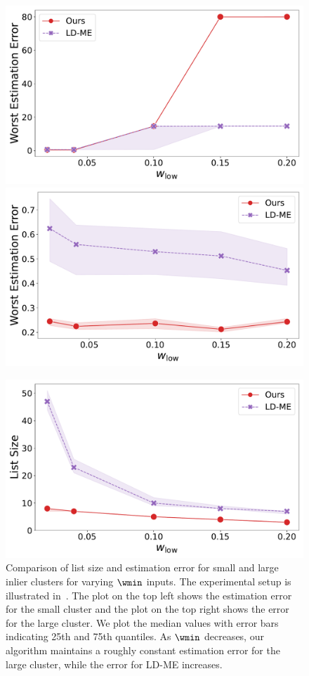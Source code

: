 \begin{figure}[hb]
    \centering
    \begin{minipage}[t]{\linewidth}
        \includegraphics[width=0.4\linewidth]
        {chapters/robust/figures/wlow_variation_error_small.pdf}
        \includegraphics[width=0.4\linewidth]{chapters/robust/figures/wlow_variation_error_large.pdf}
    \end{minipage}
    \begin{minipage}[t]{\linewidth}
        \centering
        \includegraphics[width=0.4\linewidth]{chapters/robust/figures/wlow_variation_size.pdf}
    \end{minipage}
    \caption{Comparison of list size and estimation error for small and large inlier clusters for varying \(\wmin\) inputs. The experimental setup is illustrated in~. The plot on the top left shows the estimation error for the small cluster and the plot on the top right shows the error for the large cluster. We plot the median values with error bars indicating 25th and 75th quantiles. As \(\wmin\) decreases, our algorithm maintains a roughly constant estimation error for the large cluster, while the error for LD-ME increases.}
    \label{fig:wlow_variation}
\end{figure}

